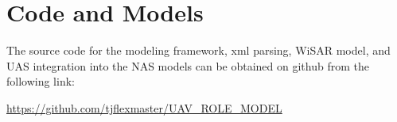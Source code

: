 \chapter{Code and Models} \label{code}

The source code for the modeling framework, xml parsing, WiSAR model, and UAS integration into the NAS models can be obtained on github from the following link:

\url{https://github.com/tjflexmaster/UAV_ROLE_MODEL}